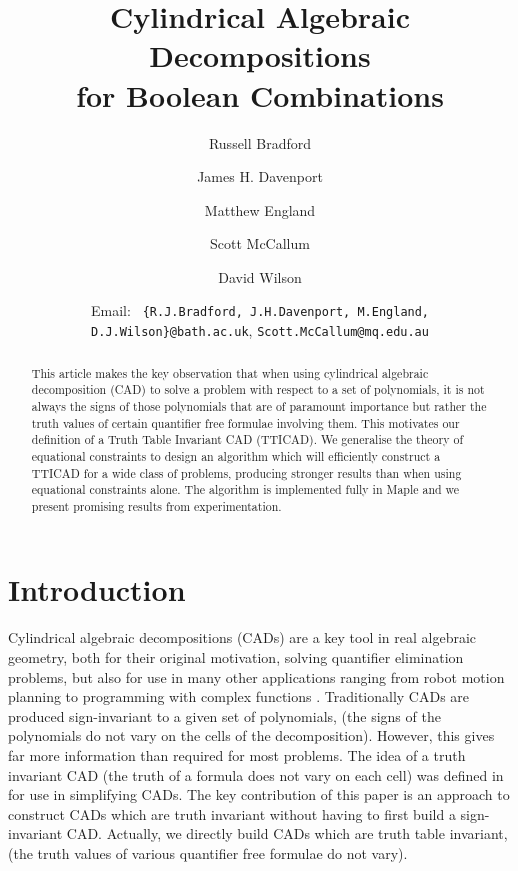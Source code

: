 \documentclass{article}
\begin{document}
\title{Cylindrical Algebraic Decompositions \\ for Boolean Combinations}

\author[*]{Russell Bradford}
\author[*]{James H. Davenport}
\author[*]{Matthew England}
\author[**]{Scott McCallum}
\author[*]{David Wilson}

\date{Email: \texttt{ \{R.J.Bradford, J.H.Davenport, M.England, D.J.Wilson\}@bath.ac.uk}, {\tt Scott.McCallum@mq.edu.au} }

\maketitle

\begin{abstract} 
This article makes the key observation that when using cylindrical algebraic decomposition  (CAD) to solve a problem with respect to a set of polynomials, it is not always the signs of those polynomials that are of paramount importance but rather the truth values of certain quantifier free formulae involving them. This motivates our definition of a Truth Table Invariant CAD (TTICAD).
We generalise the theory of equational constraints to design an algorithm which will efficiently construct a TTICAD for a wide class of problems, producing stronger results than when using equational constraints alone. The algorithm is implemented fully in {\sc Maple} and we present promising results from experimentation.
\end{abstract}





\section{Introduction}
\label{sec:Intro}

Cylindrical algebraic decompositions (CADs) are a key tool in real algebraic geometry, both for their original motivation, solving quantifier elimination problems, but also for use in many other applications ranging from robot motion planning \cite[etc.]{SchwartzSharir1983b} to programming with complex functions \cite[etc.]{DBEW12}.  Traditionally CADs are produced sign-invariant to a given set of polynomials, (the signs of the polynomials do not vary on the cells of the decomposition).  However, this gives far more information than required for most problems.  The idea of a truth invariant CAD (the truth of a formula does not vary on each cell) was defined in \cite{Brown98} for use in simplifying CADs.  The key contribution of this paper is an approach to construct CADs which are truth invariant without having to first build a sign-invariant CAD.  Actually, we directly build CADs which are truth table invariant, (the truth values of various quantifier free formulae do not vary).  
\end{document}
